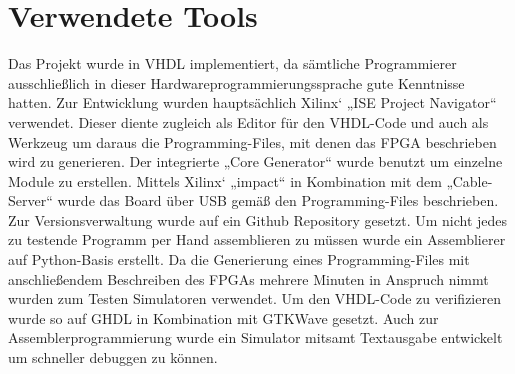 \section{Verwendete Tools}
Das Projekt wurde in VHDL implementiert, da sämtliche Programmierer ausschließlich in dieser Hardwareprogrammierungssprache gute Kenntnisse hatten.
Zur Entwicklung wurden hauptsächlich Xilinx‘ „ISE Project Navigator“ verwendet. Dieser diente zugleich als Editor für den VHDL-Code und auch als Werkzeug um daraus die Programming-Files, mit denen das FPGA beschrieben wird zu generieren. Der integrierte „Core Generator“ wurde benutzt um einzelne Module zu erstellen.
Mittels Xilinx‘ „impact“ in Kombination mit dem „Cable-Server“ wurde das Board über USB gemäß den Programming-Files beschrieben.
Zur Versionsverwaltung wurde auf ein Github Repository gesetzt.
Um nicht jedes zu testende Programm per Hand assemblieren zu müssen wurde ein Assemblierer auf Python-Basis erstellt.
Da die Generierung eines Programming-Files mit anschließendem Beschreiben des FPGAs mehrere Minuten in Anspruch nimmt wurden zum Testen Simulatoren verwendet. Um den VHDL-Code zu verifizieren wurde so auf GHDL in Kombination mit GTKWave gesetzt. Auch zur Assemblerprogrammierung wurde ein Simulator mitsamt Textausgabe entwickelt um schneller debuggen zu können.


